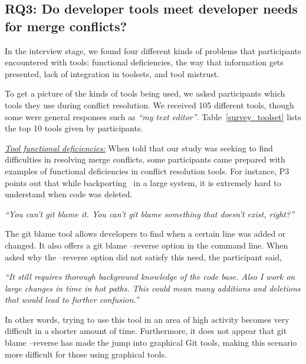 \subsection{\textbf{RQ3:} Do developer tools meet developer needs for merge conflicts?}\label{RQ3}

In the interview stage, we found four different kinds of problems that participants encountered with tools: functional deficiencies, the way that information gets presented, lack of integration in toolsets, and tool mistrust.

To get a picture of the kinds of tools being used, we asked participants which tools they use during conflict resolution. We received 105 different tools, though some were general responses such as \textit{``my text editor''}. Table~\ref{survey_toolset} lists the top 10 tools given by participants.

\underline{\textit{Tool functional deficiencies:}}
When told that our study was seeking to find difficulties in resolving merge conflicts, some participants came prepared with examples of functional deficiencies in conflict resolution tools. For instance, P3 points out that while backporting~\cite{gutzmann2009backporting} in a large system, it is extremely hard to understand when code was deleted. 

\begin{displayquote}
\textit{``You can't git blame it. You can't git blame something that doesn't exist, right?''}
\end{displayquote}

The git blame tool allows developers to find when a certain line was added or changed. It also offers a git blame --reverse option in the command line. When asked why the --reverse option did not satisfy this need, the participant said, 

\begin{displayquote}
\textit{``It still requires thorough background knowledge of the code base. Also I work on large changes in time in hot paths. This could mean many additions and deletions that would lead to further confusion.''}
\end{displayquote}

 In other words, trying to use this tool in an area of high activity becomes very difficult in a shorter amount of time. Furthermore, it does not appear that git blame --reverse has made the jump into graphical Git tools, making this scenario more difficult for those using graphical tools.
 
